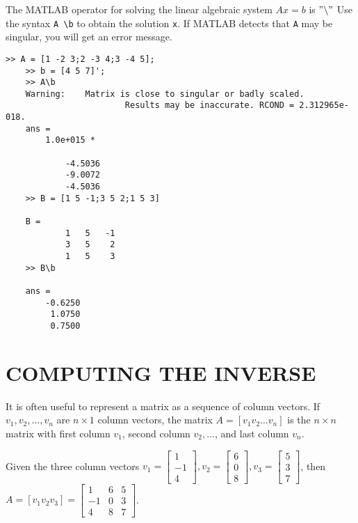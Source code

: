 \documentclass[../main.tex]{subfiles}
\begin{document}
The MATLAB operator for solving the linear algebraic system $A x=b$ is $" \backslash "$ Use the syntax \texttt{A \textbackslash b} to obtain the solution \texttt{x}. If MATLAB detects that \texttt{A} may be singular, you will get an error message.

\begin{lstlisting}[numbers=none,frame=none]
	>> A = [1 -2 3;2 -3 4;3 -4 5];
	>> b = [4 5 7]';
	>> A\b
	Warning:	Matrix is close to singular or badly scaled.
						Results may be inaccurate. RCOND = 2.312965e-018.
	ans =
		1.0e+015 *

			-4.5036
			-9.0072
			-4.5036
	>> B = [1 5 -1;3 5 2;1 5 3]

	B =
			1	5	-1
			3	5	 2
			1	5	 3
	>> B\b

	ans =
		-0.6250
		 1.0750
		 0.7500
\end{lstlisting}



\section[Computing the Inverse]{COMPUTING THE INVERSE}
It is often useful to represent a matrix as a sequence of column vectors. If $v_{1}, v_{2}, \ldots, v_{n}$ are $n \times 1$ column vectors, the matrix $A=\left[v_{1} v_{2} \ldots v_{n}\right]$ is the $n \times n$ matrix with first column $v_{1}$, second column $v_{2}, \ldots$, and last column $v_{n} .$

Given the three column vectors $v_{1}=\left[\begin{array}{c}1 \\ -1 \\ 4\end{array}\right], v_{2}=\left[\begin{array}{l}6 \\ 0 \\ 8\end{array}\right], v_{3}=\left[\begin{array}{l}5 \\ 3 \\ 7\end{array}\right]$, then $A=\left[v_{1} v_{2} v_{3}\right]=\left[\begin{array}{ccc}1 & 6 & 5 \\ -1 & 0 & 3 \\ 4 & 8 & 7\end{array}\right]$.
\end{document}
